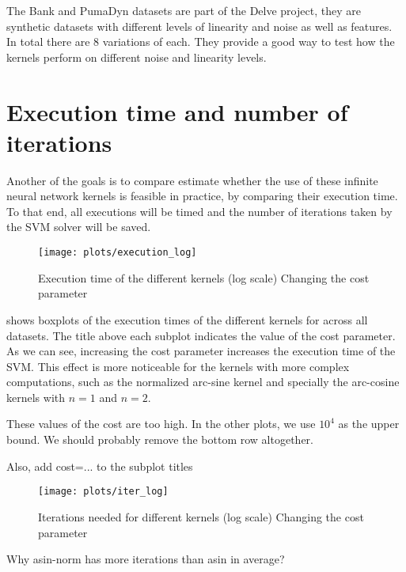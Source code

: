 
The Bank and PumaDyn datasets are part of the Delve project, they are synthetic
datasets with different levels of linearity and noise as well as features. In total
there are 8 variations of each. They provide a good way to test how the kernels
perform on different noise and linearity levels.

\section{Execution time and number of iterations}%
\label{sec:execution-time-and-number-of-iterations}

Another of the goals is to compare estimate whether the use of these infinite
neural network kernels is feasible in practice, by comparing their execution
time. To that end, all executions will be timed and the number of iterations
taken by the SVM solver will be saved.

\begin{figure}[H]
    \texttt{[image: plots/execution\_log]}
    \caption{Execution time of the different kernels (log scale) Changing the cost
        parameter}%
    \label{fig:execution-log}
\end{figure}

 shows boxplots of the execution times of the different
kernels for across all datasets. The title above each subplot indicates the
value of the cost parameter. As we can see, increasing the cost parameter
increases the execution time of the SVM. This effect is more noticeable for the
kernels with more complex computations, such as the normalized arc-sine kernel
and specially the arc-cosine kernels with $n=1$ and $n=2$.

\begin{cnote}
    These values of the cost are too high.
    In the other plots, we use $10^4$ as the upper bound.
    We should probably remove the bottom row altogether.

    Also, add cost=... to the subplot titles
\end{cnote}

\begin{figure}[H]
    \texttt{[image: plots/iter\_log]}
    \caption{Iterations needed for different kernels (log scale) Changing the cost
        parameter}
\end{figure}

\begin{cnote}
    Why asin-norm has more iterations than asin in average?
\end{cnote}

